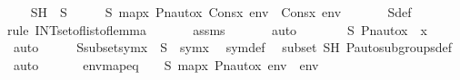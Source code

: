 \begin{isabellebody}
\ \ \isamarkupfalse%
\ SH\ {\isacharcolon}{\kern0pt}\ {\isachardoublequoteopen}S\ {\isasymin}\ {\isasymF}\ {\isasymand}\ {\isacharparenleft}{\kern0pt}{\isasymforall}{\isasympi}\ {\isasymin}\ S{\isachardot}{\kern0pt}\ map{\isacharparenleft}{\kern0pt}{\isasymlambda}x{\isachardot}{\kern0pt}\ Pn{\isacharunderscore}{\kern0pt}auto{\isacharparenleft}{\kern0pt}{\isasympi}{\isacharparenright}{\kern0pt}{\isacharbackquote}{\kern0pt}x{\isacharcomma}{\kern0pt}\ Cons{\isacharparenleft}{\kern0pt}x{\isacharcomma}{\kern0pt}\ env{\isacharparenright}{\kern0pt}{\isacharparenright}{\kern0pt}\ {\isacharequal}{\kern0pt}\ Cons{\isacharparenleft}{\kern0pt}x{\isacharcomma}{\kern0pt}\ env{\isacharparenright}{\kern0pt}{\isacharparenright}{\kern0pt}{\isachardoublequoteclose}\ \isanewline
\ \ \ \ \isamarkupfalse%
\ S{\isacharunderscore}{\kern0pt}def\isanewline
\ \ \ \ \isamarkupfalse%
{\isacharparenleft}{\kern0pt}rule\ INT{\isacharunderscore}{\kern0pt}set{\isacharunderscore}{\kern0pt}of{\isacharunderscore}{\kern0pt}list{\isacharunderscore}{\kern0pt}of{\isacharunderscore}{\kern0pt}{\isasymF}{\isacharunderscore}{\kern0pt}lemma{\isacharparenright}{\kern0pt}\ \isanewline
\ \ \ \ \isamarkupfalse%
\ assms\ \isanewline
\ \ \ \ \isamarkupfalse%
\ auto\isanewline
\ \ \isamarkupfalse%
\ \isamarkupfalse%
\ {\isachardoublequoteopen}{\isasymforall}{\isasympi}\ {\isasymin}\ S{\isachardot}{\kern0pt}\ Pn{\isacharunderscore}{\kern0pt}auto{\isacharparenleft}{\kern0pt}{\isasympi}{\isacharparenright}{\kern0pt}{\isacharbackquote}{\kern0pt}x\ {\isacharequal}{\kern0pt}\ x{\isachardoublequoteclose}\ \isamarkupfalse%
\ auto\isanewline
\ \ \isamarkupfalse%
\ \isamarkupfalse%
\ Ssubsetsymx\ {\isacharcolon}{\kern0pt}\ {\isachardoublequoteopen}S\ {\isasymsubseteq}\ sym{\isacharparenleft}{\kern0pt}x{\isacharparenright}{\kern0pt}{\isachardoublequoteclose}\ \isamarkupfalse%
\ sym{\isacharunderscore}{\kern0pt}def\ \isamarkupfalse%
\ {\isasymF}{\isacharunderscore}{\kern0pt}subset\ SH\ P{\isacharunderscore}{\kern0pt}auto{\isacharunderscore}{\kern0pt}subgroups{\isacharunderscore}{\kern0pt}def\ \isamarkupfalse%
\ auto\ \isanewline
\ \ \isamarkupfalse%
\ \isamarkupfalse%
\ envmapeq\ {\isacharcolon}{\kern0pt}\ {\isachardoublequoteopen}{\isasymforall}{\isasympi}\ {\isasymin}\ S{\isachardot}{\kern0pt}\ map{\isacharparenleft}{\kern0pt}{\isasymlambda}x{\isachardot}{\kern0pt}\ Pn{\isacharunderscore}{\kern0pt}auto{\isacharparenleft}{\kern0pt}{\isasympi}{\isacharparenright}{\kern0pt}{\isacharbackquote}{\kern0pt}x{\isacharcomma}{\kern0pt}\ env{\isacharparenright}{\kern0pt}\ {\isacharequal}{\kern0pt}\ env{\isachardoublequoteclose}\ \isamarkupfalse%

\end{isabellebody}
